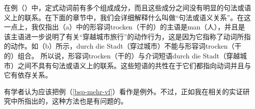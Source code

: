 \noindent
在例（）中，定式动词前有多个组成成分，而且这些成分之间没有明显的句法或语义上的联系。在下面的章节中，我们会详细解释什么叫做“句法或语义关系”。在这一点上，我仅指出（a）中的形容词trocken（干的）的主语是man（人），并且是该主语进一步说明了有关“穿越城市旅行”的动作行为，这是因为它指称了动词所指的动作。如（b）所示，durch die Stadt（穿过城市）不能与形容词trocken（干的）组合。
\eal
{}
\zl
所以说，形容词trocken（干的）与介词短语durch die Stadt（穿越城市）之间不具有句法或语义上的联系。这些短语的共性在于它们都指向动词并且与它有依存关系。

有学者认为应该把例（\ref{bsp-mehr-vf}）看作是例外。不过，正如我在相关的实证研究中所指出的，这种方法也是有问题的\citep{Mueller2003b}。

